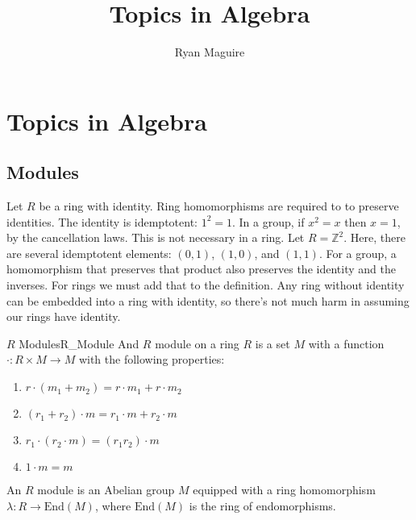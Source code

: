 \documentclass[crop=false,class=book,oneside]{standalone}                      %
\begin{document}
        \title{Topics in Algebra}
        \author{Ryan Maguire}
        \date{\vspace{-5ex}}
        \maketitle
        \tableofcontents
        \clearpage
        \chapter*{Topics in Algebra}
        \vspace{10ex}
        \setcounter{chapter}{1}
    \section{Modules}
        Let $R$ be a ring with identity. Ring homomorphisms are required to
        to preserve identities. The identity is idemptotent:
        $1^{2}=1$. In a group, if $x^{2}=x$ then $x=1$, by the cancellation
        laws. This is not necessary in a ring. Let $R=\mathbb{Z}^{2}$. Here,
        there are several idemptotent elements: $(0,1)$, $(1,0)$, and $(1,1)$.
        For a group, a homomorphism that preserves that product also preserves
        the identity and the inverses. For rings we must add that to the
        definition. Any ring without identity can be embedded into a ring with
        identity, so there's not much harm in assuming our rings have identity.
        \begin{ldefinition}{$R$ Modules}{R_Module}
            And $R$ module on a ring $R$ is a set $M$ with a function
            $\cdot:R\times{M}\rightarrow{M}$ with the following properties:
            \begin{enumerate}
                \item $r\cdot(m_{1}+m_{2})=r\cdot{m}_{1}+r\cdot{m}_{2}$
                \item $(r_{1}+r_{2})\cdot{m}=r_{1}\cdot{m}+r_{2}\cdot{m}$
                \item $r_{1}\cdot(r_{2}\cdot{m})=(r_{1}r_{2})\cdot{m}$
                \item $1\cdot{m}=m$
            \end{enumerate}
        \end{ldefinition}
        \begin{theorem}
            An $R$ module is an Abelian group $M$ equipped with a ring
            homomorphism $\lambda:R\rightarrow\textrm{End}(M)$, where
            $\textrm{End}(M)$ is the ring of endomorphisms.
        \end{theorem}
\end{document}
